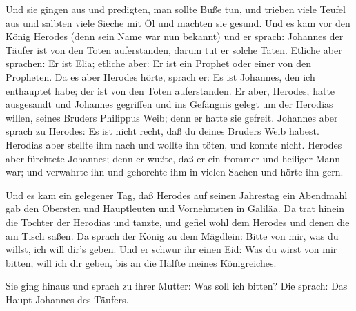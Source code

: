  Und sie gingen aus und predigten, man sollte Buße tun,
 und trieben viele Teufel aus und salbten viele Sieche mit
Öl und machten sie gesund.  Und es kam vor den König
Herodes (denn sein Name war nun bekannt) und er sprach: Johannes der
Täufer ist von den Toten auferstanden, darum tut er solche Taten.
 Etliche aber sprachen: Er ist Elia; etliche aber: Er ist
ein Prophet oder einer von den Propheten.  Da es aber
Herodes hörte, sprach er: Es ist Johannes, den ich enthauptet habe; der
ist von den Toten auferstanden.  Er aber, Herodes, hatte
ausgesandt und Johannes gegriffen und ins Gefängnis gelegt um der
Herodias willen, seines Bruders Philippus Weib; denn er hatte sie
gefreit.  Johannes aber sprach zu Herodes: Es ist nicht
recht, daß du deines Bruders Weib habest.  Herodias aber
stellte ihm nach und wollte ihn töten, und konnte nicht. 
Herodes aber fürchtete Johannes; denn er wußte, daß er ein frommer und
heiliger Mann war; und verwahrte ihn und gehorchte ihm in vielen Sachen
und hörte ihn gern.

 Und es kam ein gelegener Tag, daß Herodes auf seinen
Jahrestag ein Abendmahl gab den Obersten und Hauptleuten und Vornehmsten
in Galiläa.  Da trat hinein die Tochter der Herodias und
tanzte, und gefiel wohl dem Herodes und denen die am Tisch saßen. Da
sprach der König zu dem Mägdlein: Bitte von mir, was du willst, ich will
dir's geben.  Und er schwur ihr einen Eid: Was du wirst von
mir bitten, will ich dir geben, bis an die Hälfte meines Königreiches.

 Sie ging hinaus und sprach zu ihrer Mutter: Was soll ich
bitten? Die sprach: Das Haupt Johannes des Täufers.

